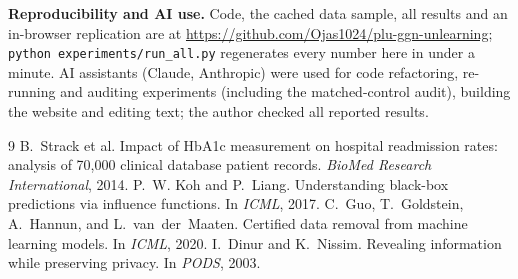 \documentclass{article}
\begin{document}
\textbf{Reproducibility and AI use.} Code, the cached data sample, all results and an in-browser
replication are at \url{https://github.com/Ojas1024/plu-ggn-unlearning};
\texttt{python experiments/run\_all.py} regenerates every number here in under a minute. AI assistants
(Claude, Anthropic) were used for code refactoring, re-running and auditing experiments (including
the matched-control audit), building the website and editing text; the author checked all reported results.

{\small
\begin{thebibliography}{9}\setlength{\itemsep}{0pt}
 B.~Strack et al. Impact of HbA1c measurement on hospital readmission rates: analysis of 70{,}000 clinical database patient records. \emph{BioMed Research International}, 2014.
 P.~W. Koh and P.~Liang. Understanding black-box predictions via influence functions. In \emph{ICML}, 2017.
 C.~Guo, T.~Goldstein, A.~Hannun, and L.~van~der~Maaten. Certified data removal from machine learning models. In \emph{ICML}, 2020.
 I.~Dinur and K.~Nissim. Revealing information while preserving privacy. In \emph{PODS}, 2003.
\end{thebibliography}
}
\end{document}
